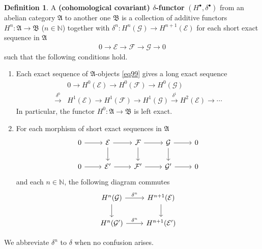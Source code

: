 \documentclass[12pt,b5paper,notitlepage]{report}
\theoremstyle{definition}
\newtheorem{df}{Definition}[section]
\theoremstyle{plain}
\newcommand{\fk}{\mathfrak}
\newcommand{\mc}{\mathcal}
\newcommand{\blt}{\bullet}
\newcommand{\Nbb}{\mathbb N}
\numberwithin{equation}{section}
\begin{document}
\begin{df}\label{lb251}
A \textbf{(cohomological covariant) $\delta$-functor}  $(H^\blt,\delta^\blt)$ from an abelian category $\fk A$ to another one $\fk B$ is a collection of additive functors $H^n:\fk A\rightarrow\fk B$ ($n\in\Nbb$) together with $\delta^n:H^n(\mc G)\rightarrow H^{n+1}(\mc E)$ for each short exact sequence in $\fk A$
\begin{align}
0\rightarrow\mc E\rightarrow\mc F\rightarrow\mc G\rightarrow 0\label{eq99}
\end{align}
such that the following conditions hold.
\begin{enumerate}[label=(\arabic*)]
\item Each exact sequence of $\fk A$-objects \eqref{eq99} gives a long exact sequence 
\begin{align*}
&0\rightarrow H^0(\mc E)\rightarrow H^0(\mc F)\rightarrow H^0(\mc G)\\
\xrightarrow{\delta^0}& H^1(\mc E)\rightarrow H^1(\mc F)\rightarrow H^1(\mc G)\xrightarrow{\delta^1} H^2(\mc E)\rightarrow \cdots
\end{align*}
In particular, the functor $H^0:\fk A\rightarrow\fk B$ is left exact.
\item For each morphism of short exact sequences in $\fk A$
\begin{equation}\label{eq103}
\begin{tikzcd}
0 \arrow[r] & \mc E \arrow[r] \arrow[d] & \mc F \arrow[r] \arrow[d] & \mc G \arrow[r] \arrow[d] & 0 \\
0 \arrow[r] & \mc E' \arrow[r]          & \mc F' \arrow[r]          & \mc G' \arrow[r]          & 0
\end{tikzcd}
\end{equation}
and each $n\in\Nbb$, the following diagram commutes
\begin{equation*}
\begin{tikzcd}
H^n(\mc G) \arrow[r,"\delta^n"] \arrow[d] & H^{n+1}(\mc E) \arrow[d] \\
H^n(\mc G') \arrow[r,"\delta^n"]           & H^{n+1}(\mc E')          
\end{tikzcd}
\end{equation*}
\end{enumerate}
We abbreviate $\delta^n$ to $\delta$ when no confusion arises.
\end{df}
\end{document}
